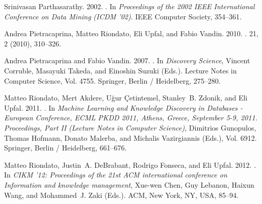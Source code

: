 \begin{thebibliography}{00}
{Srinivasan Parthasarathy}. 2002.
\newblock {}. In {\em Proceedings of the 2002 IEEE International Conference on Data
  Mining} {\em (ICDM '02)}. IEEE Computer Society, 354--361.
\newblock


{Andrea Pietracaprina}, {Matteo Riondato}, {Eli Upfal}, {and} {Fabio Vandin}.
  2010.
\newblock {}.
 {21}, 2 (2010), 310--326.
\newblock


{Andrea Pietracaprina} {and} {Fabio Vandin}. 2007.
\newblock {}.
\newblock In {\em Discovery Science}, {Vincent Corruble}, {Masayuki Takeda},
  {and} {Einoshin Suzuki} (Eds.). Lecture Notes in Computer Science, Vol. 4755.
  Springer, Berlin / Heidelberg, 275--280.
\newblock


{Matteo Riondato}, {Mert Akdere}, {U\u{g}ur \c{C}etintemel}, {Stanley~B.
  Zdonik}, {and} {Eli Upfal}. 2011.
\newblock {}. In {\em Machine Learning and Knowledge
  Discovery in Databases - European Conference, ECML PKDD 2011, Athens, Greece,
  September 5-9, 2011. Proceedings, Part II} {\em (Lecture Notes in Computer
  Science)}, {Dimitrios Gunopulos}, {Thomas Hofmann}, {Donato Malerba}, {and}
  {Michalis Vazirgiannis} (Eds.), Vol. 6912. Springer, Berlin / Heidelberg,
  661--676.


{Matteo Riondato}, {Justin~A. DeBrabant}, {Rodrigo Fonseca}, {and} {Eli Upfal}.
  2012.
\newblock {}. In {\em CIKM '12: Proceedings of
  the 21st ACM international conference on Information and knowledge
  management}, {Xue-wen Chen}, {Guy Lebanon}, {Haixun Wang}, {and} {Mohammed~J.
  Zaki} (Eds.). ACM, New York, NY, USA, 85--94.



\end{thebibliography}
